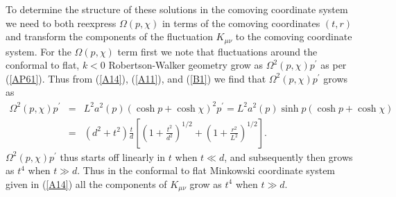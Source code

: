 To determine the structure of these solutions in the comoving coordinate system we need to both reexpress $\Omega(p,\chi)$ in terms of the comoving coordinates $(t,r)$ and transform the components of the fluctuation $K_{\mu\nu}$ to the comoving coordinate system. For the $\Omega(p,\chi)$ term first  we note that fluctuations around the conformal to flat, $k<0$ Robertson-Walker geometry grow as $\Omega^2(p,\chi)p^{\prime}$ as per (\ref{AP61}). Thus  from (\ref{A14}), (\ref{A11}), and (\ref{B1}) we find that $\Omega^2(p,\chi)p^{\prime}$ grows as
%
\begin{eqnarray}
\Omega^2(p,\chi)p^{\prime}&=&L^2a^2(p)(\cosh p+\cosh \chi)^2p^{\prime}=L^2a^2(p)\sinh p (\cosh p+\cosh \chi)
\nonumber\\
&=&(d^2+t^2)\frac{t}{d}\left[\left(1+\frac{t^2}{d^2}\right)^{1/2}+\left(1+\frac{r^2}{L^2}\right)^{1/2}\right].
\label{B6}
\end{eqnarray}
%
$\Omega^2(p,\chi)p^{\prime}$ thus starts off linearly in $t$ when $t\ll d$, and subsequently then grows as $t^4$ when $t\gg d$. Thus in the conformal to flat Minkowski coordinate system given in (\ref{A14}) all the components of $K_{\mu\nu}$ grow as $t^4$ when $t \gg d$.

